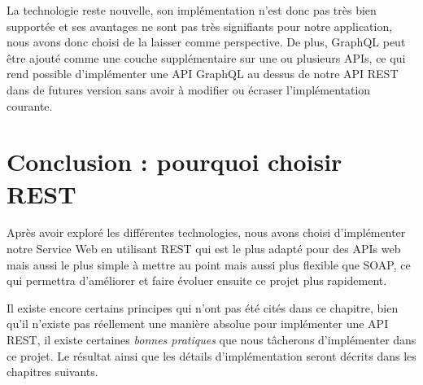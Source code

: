\begin{description}
La technologie reste nouvelle, son implémentation n'est donc pas très bien supportée et ses avantages ne sont pas très signifiants pour notre application, nous avons donc choisi de la laisser comme perspective. 
De plus, GraphQL peut être ajouté comme une couche supplémentaire sur une ou plusieurs APIs, ce qui rend possible d'implémenter une API GraphQL au dessus de notre API REST dans de futures version sans avoir à modifier ou écraser l'implémentation courante.\cite{GraphQL}
\end{description}

\section{Conclusion : pourquoi choisir REST}
	Après avoir exploré les différentes technologies, nous avons choisi d'implémenter notre Service Web en utilisant REST qui est le plus adapté pour des APIs web mais aussi le plus simple à mettre au point mais aussi plus flexible que SOAP, ce qui permettra d'améliorer et faire évoluer ensuite ce projet plus rapidement.
	
	Il existe encore certains principes qui n'ont pas été cités dans ce chapitre, bien qu'il n'existe pas réellement une manière absolue pour implémenter une API REST, il existe certaines \emph{bonnes pratiques} que nous tâcherons d'implémenter dans ce projet. Le résultat ainsi que les détails d'implémentation seront décrits dans les chapitres suivants.
